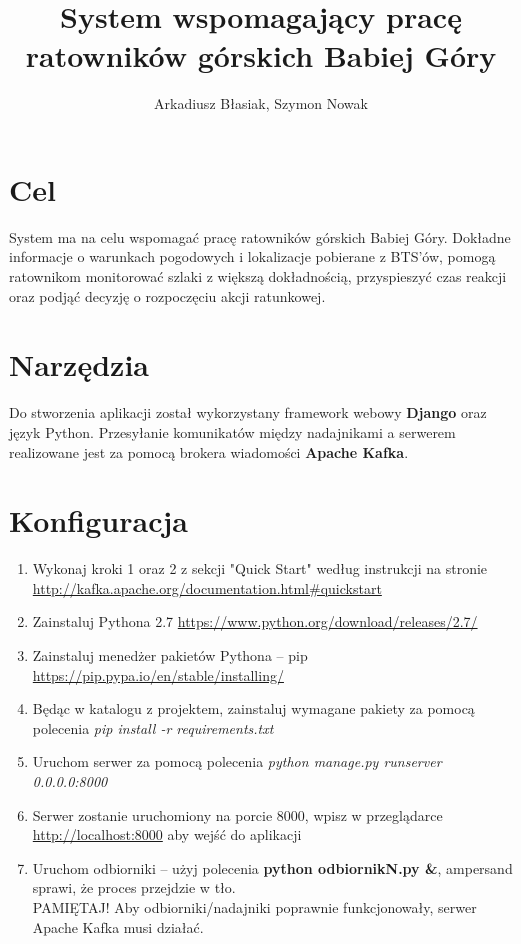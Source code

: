 \documentclass[a4paper,12pt]{article}
\title{System wspomagający pracę ratowników górskich Babiej Góry}
\author{Arkadiusz Błasiak, Szymon Nowak}
\date{}
\begin{document}
\maketitle
\tableofcontents
\newpage
\section{Cel}
System ma na celu wspomagać pracę ratowników górskich Babiej Góry. Dokładne informacje o warunkach pogodowych i lokalizacje pobierane z BTS’ów, pomogą ratownikom monitorować szlaki z większą dokładnością, przyspieszyć czas reakcji oraz podjąć decyzję o rozpoczęciu akcji ratunkowej.
\section{Narzędzia}
Do stworzenia aplikacji został wykorzystany framework webowy \textbf{Django} oraz język Python. Przesyłanie komunikatów między nadajnikami a serwerem realizowane jest za pomocą brokera wiadomości \textbf{Apache Kafka}.
\section{Konfiguracja}
\begin{enumerate}
\item Wykonaj kroki 1 oraz 2 z sekcji "Quick Start" według instrukcji na stronie \url{http://kafka.apache.org/documentation.html#quickstart}
\item Zainstaluj Pythona 2.7 \url{https://www.python.org/download/releases/2.7/}
\item Zainstaluj menedżer pakietów Pythona -- pip \url{https://pip.pypa.io/en/stable/installing/}
\item Będąc w katalogu z projektem, zainstaluj wymagane pakiety za pomocą polecenia \textit{pip install -r requirements.txt}
\item Uruchom serwer za pomocą polecenia \textit{python manage.py runserver 0.0.0.0:8000}
\item Serwer zostanie uruchomiony na porcie 8000, wpisz w przeglądarce \url{http://localhost:8000} aby wejść do aplikacji
\item Uruchom odbiorniki -- użyj polecenia \textbf{python odbiornikN.py \&}, ampersand sprawi, że proces przejdzie w tło.\\ PAMIĘTAJ! Aby odbiorniki/nadajniki poprawnie funkcjonowały, serwer Apache Kafka musi działać.
\end{enumerate}
\newpage
\end{document}

